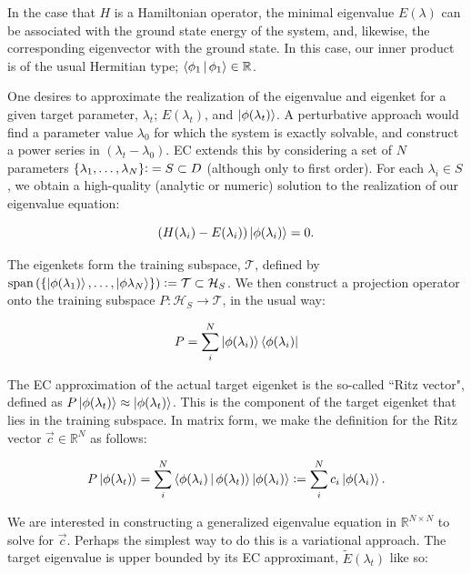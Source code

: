 \documentclass[%
 reprint,
 amsmath,amssymb,
 aps,
]{revtex4-2}
\begin{document}
In the case that $H$ is a Hamiltonian operator, the minimal eigenvalue $E(\lambda)$ can be associated with the ground state energy
of the system, and, likewise, the corresponding eigenvector with the ground state. In this case, our inner product is of the usual Hermitian type; $\Braket{\phi_1|\phi_1} \in \mathbb{R}$.

One desires to approximate the realization of the eigenvalue and eigenket for a given target parameter, $\lambda_t$; $E(\lambda_t)$, and $\ket{\phi(\lambda_t)}$. A perturbative approach would find a parameter value $\lambda_0$ for which the system is exactly solvable, and construct a power series in $(\lambda_t - \lambda_0)$. \ac{EC} extends this by considering a set of $N$ parameters $\{\lambda_1, \ldots , \lambda_N \} {\vcentcolon}= S \subset D$ (although only to first order). For
each $\lambda_i \in S$, we obtain a high-quality (analytic or numeric) solution to the realization of our eigenvalue equation:

\begin{equation}
  \left( H(\lambda_i) - E(\lambda_i)  \right) \ket{\phi(\lambda_i)} = 0.
\end{equation}

The eigenkets form the training subspace, $\mathcal{T}$, defined by $ \text{span} \left( \{\ket{\phi(\lambda_1)}, \ldots, \ket{\phi{\lambda_N}}\} \right) \vcentcolon= \mathcal{T} \subset \mathcal{H}_S$. We then construct a projection operator onto the training subspace $P : \mathcal{H}_S \rightarrow \mathcal{T} $, in the usual way:

\begin{equation}
  P = \sum_i^N \ket{\phi(\lambda_i)} \bra{\phi(\lambda_i)}
\end{equation}

The \ac{EC} approximation of the actual target eigenket is the so-called ``Ritz vector", defined as $P \ket{\phi(\lambda_t)} \approx \ket{\phi(\lambda_t)}$. This is the component of the target eigenket that lies in the training subspace. In matrix form, we make the definition for the Ritz vector $\vec{c} \in \mathbb{R}^N$ as follows:

\begin{equation}
  P \ket{\phi(\lambda_t)} = \sum_i^N \Braket{\phi(\lambda_i) |  \phi(\lambda_t)} \ket{\phi(\lambda_i)} \vcentcolon = \sum_i^N c_i \ket{\phi(\lambda_i)}.
\end{equation}

We are interested in constructing a generalized eigenvalue equation in $\mathbb{R}^{N\times N}$ to solve for $\vec{c}$. Perhaps the simplest way to do this is a variational approach. The target eigenvalue is upper bounded by its \ac{EC} approximant, $\tilde{E}(\lambda_t)$ like so:
\end{document}
